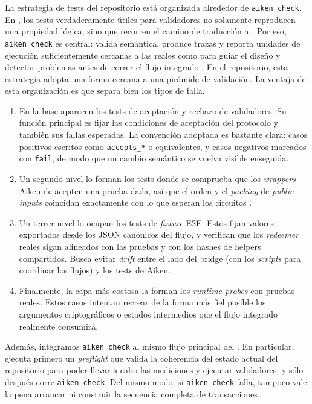 La estrategia de tests del repositorio está organizada alrededor de \texttt{aiken check}. En \Cardano, los tests verdaderamente útiles para validadores no solamente reproducen una propiedad lógica, sino que recorren el camino de traducción a \UPLC. Por eso, \texttt{aiken check} es central: valida semántica, produce trazas y reporta unidades de ejecución suficientemente cercanas a las reales como para guiar el diseño y detectar problemas antes de correr el flujo integrado \cite{aiken2026}. En el repositorio, esta estrategia adopta una forma cercana a una pirámide de validación. La ventaja de esta organización es que separa bien los tipos de falla.

\begin{enumerate}[noitemsep]
  \item En la base aparecen los tests de aceptación y rechazo de validadores. Su función principal es fijar las condiciones de aceptación del protocolo y también sus fallas esperadas. La convención adoptada es bastante clara: casos positivos escritos como \texttt{accepts\_*} o equivalentes, y casos negativos marcados con \texttt{fail}, de modo que un cambio semántico se vuelva visible enseguida.
  \item Un segundo nivel lo forman los tests donde se comprueba que los \textit{wrappers} Aiken de \Groth acepten una prueba dada, así que el orden y el \textit{packing} de \textit{public inputs} coincidan exactamente con lo que esperan los circuitos \Groth.
  \item Un tercer nivel lo ocupan los tests de \textit{fixture} E2E. Estos fijan valores exportados desde los JSON canónicos del flujo, y verifican que los \textit{redeemer} reales sigan alineados con las pruebas y con los hashes de helpers compartidos. Busca evitar \textit{drift} entre el lado \Offchain del bridge (con los \textit{scripts} para coordinar los flujos) y los tests de Aiken.
  \item Finalmente, la capa más costosa la forman los \textit{runtime probes} con pruebas reales. Estos casos intentan recrear de la forma más fiel posible los argumentos criptográficos o estados intermedios que el flujo integrado realmente consumirá.
\end{enumerate}

Además, integramos \texttt{aiken check} al mismo flujo principal del \zkBridge. En particular, \BridgeRunStrictCommand ejecuta primero un \textit{preflight} que valida la coherencia del estado actual del repositorio para poder llevar a cabo las mediciones y ejecutar validadores, y sólo después corre \texttt{aiken check}. Del mismo modo, si \texttt{aiken check} falla, tampoco vale la pena arrancar \Dolos ni construir la secuencia completa de transacciones.

